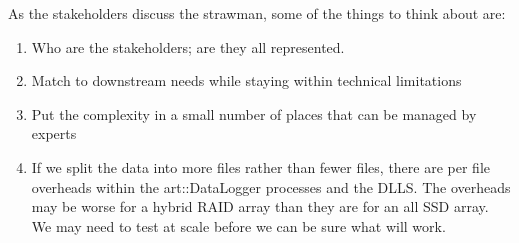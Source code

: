 As the stakeholders discuss the strawman, some of the things to think about are:

\begin{enumerate}
  \item Who are the stakeholders; are they all represented.
  \item Match to downstream needs while staying within technical limitations
  \item Put the complexity in a small number of places that can be managed by experts
  \item If we split the data into more files rather than fewer files, there are per file
    overheads within the {\code art::DataLogger} processes and the DLLS.  The overheads
    may be worse for a hybrid RAID array than they are for an all SSD array.
    We may need to test at scale before we can be sure what will work.
\end{enumerate}

